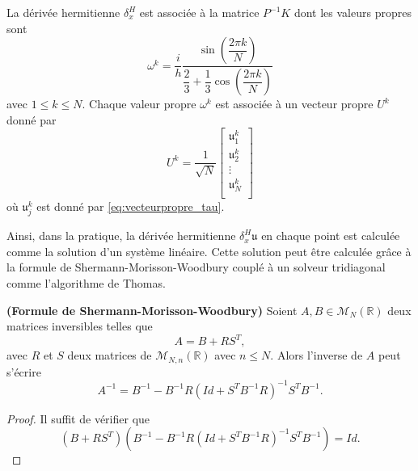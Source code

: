\begin{proposition}
La dérivée hermitienne $\delta_x^H$ est associée à la matrice $P^{-1}K$ dont les valeurs propres sont
\begin{equation}
\omega^k = \dfrac{i}{h} \dfrac{\sin \left( \dfrac{2 \pi k}{N} \right)}{\dfrac{2}{3} + \dfrac{1}{3}\cos \left( \dfrac{2 \pi k}{N} \right)}
\end{equation}
avec $1 \leq k \leq N$. Chaque valeur propre $\omega^k$ est associée à un vecteur propre $U^k$ donné par
\begin{equation}
U^k = \dfrac{1}{\sqrt{N}} \begin{bmatrix}
\mathfrak{u}^k_1 \\
\mathfrak{u}^k_2 \\
\vdots \\
\mathfrak{u}^k_N \\
\end{bmatrix}
\end{equation}
où $\mathfrak{u}^k_j$ est donné par \eqref{eq:vecteurpropre_tau}.
\label{prop:eigen_mat_hermitien}
\end{proposition}

Ainsi, dans la pratique, la dérivée hermitienne $\delta_x^H \mathfrak{u}$ en chaque point est calculée comme la solution d'un système linéaire. Cette solution peut être calculée grâce à la formule de Shermann-Morisson-Woodbury couplé à un solveur tridiagonal comme l'algorithme de Thomas.

\begin{proposition}
\textbf{(Formule de Shermann-Morisson-Woodbury)} Soient $A, B \in \mathcal{M}_N \left(\mathbb{R} \right)$ deux matrices inversibles telles que 
\begin{equation}
A = B + R S^T,
\end{equation}
avec $R$ et $S$ deux matrices de $\mathcal{M}_{N,n} \left(\mathbb{R} \right)$ avec $n \leq N$.
Alors l'inverse de $A$ peut s'écrire
\begin{equation}
A^{-1} = B^{-1} - B^{-1} R \left( Id + S^T B^{-1} R  \right)^{-1} S^T B^{-1}.
\label{eq:SMW}
\end{equation}
\end{proposition}

\begin{proof}
Il suffit de vérifier que 
\begin{equation}
\left( B + R S^T \right) \left( B^{-1} - B^{-1} R \left( Id + S^T B^{-1} R  \right)^{-1} S^T B^{-1} \right) = Id.
\end{equation}
\end{proof}


